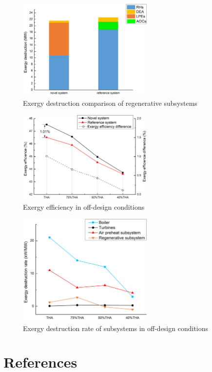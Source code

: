 \documentclass[preprint,12pt]{elsarticle}
\begin{document}
\begin{figure}[htbp]
\centering
\includegraphics[width=0.6\textwidth]{fig/regenerative_subsys_compare.png}
\caption{Exergy destruction comparison of regenerative subsystems} 
\label{fig:regenerative_subsys_compare}
\end{figure}

\begin{figure}[htbp]
\centering
\includegraphics[width=0.6\textwidth]{fig/partload_efficiency.png}
\caption{Exergy efficiency in off-design conditions} 
\label{fig:partload_efficiency}
\end{figure}

\begin{figure}[htbp]
\centering
\includegraphics[width=0.6\textwidth]{fig/partload_subsys_exergyrate.png}
\caption{Exergy destruction rate of subsystems in off-design conditions} 
\label{fig:partload_subsys_exergyrate}
\end{figure}

\section*{References}



\end{document}
